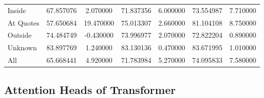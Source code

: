 \begin{table}[!ht]
\begin{tabular}{lSSSSSS@{}}
        \tabindent Inside           & 67.857076                                      & 2.070000                                    & 71.837356                                     & 6.000000  & 73.554987    & 7.710000  \\
        \tabindent At Quotes        & 57.650684                                      & 19.470000                                   & 75.013307                                     & 2.660000  & 81.104108    & 8.750000  \\
        \tabindent Outside          & 74.484749                                      & -0.430000                                   & 73.996977                                     & 2.070000  & 72.822204    & 0.890000  \\
        \tabindent Unknown          & 83.897769                                      & 1.240000                                    & 83.130136                                     & 0.470000  & 83.671995    & 1.010000  \\
        \cmidrule(rl){1-7}
        All                         & 65.668441                                      & 4.920000                                    & 71.783984                                     & 5.270000  & 74.095833    & 7.580000  \\
        \bottomrule
    \end{tabular}
\end{table}

\newpage
\subsection{Attention Heads of Transformer}
\label{app:attention-heads-of-transformer}

